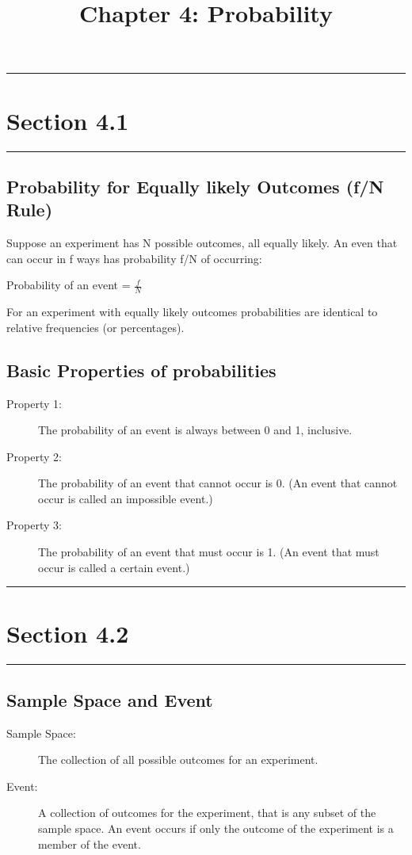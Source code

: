 \documentclass[12pt]{article}
\title{Chapter 4: Probability}
\author{}
\begin{document}
    \maketitle

    \noindent\rule{\textwidth}{0.4pt}
    \section*{Section 4.1}
    \noindent\rule{\textwidth}{0.4pt}
        \subsection*{Probability for Equally likely Outcomes (f/N Rule)}
            Suppose an experiment has N possible outcomes, all equally likely. An even that can
            occur in f ways has probability f/N of occurring:
            \begin{center}
                Probability of an event = $\frac{f}{N}$     
            \end{center}
            For an experiment with equally likely outcomes probabilities are identical to relative 
            frequencies (or percentages).
        \subsection*{Basic Properties of probabilities}
            \begin{description}
                \item[Property 1:] The probability of an event is always between 0 and 1, inclusive.
                \item[Property 2:] The probability of an event that cannot occur is 0. (An event 
                that cannot occur is called an impossible event.)
                \item[Property 3:] The probability of an event that must occur is 1. (An event that 
                must occur is called a certain event.)
            \end{description}

    \noindent\rule{\textwidth}{0.4pt}
    \section*{Section 4.2}
    \noindent\rule{\textwidth}{0.4pt}
        \subsection*{Sample Space and Event}
            \begin{description}
                \item[Sample Space:] The collection of all possible outcomes for an experiment.
                \item[Event:] A collection of outcomes for the experiment, that is any subset of the
                sample space. An event occurs if only the outcome of the experiment is a member of
                the event.
            \end{description}
\end{document}
